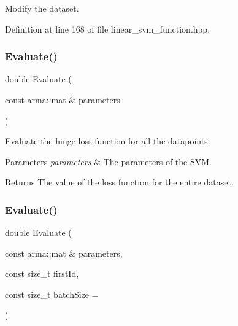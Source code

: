 Modify the dataset. 



Definition at line 168 of file linear\+\_\+svm\+\_\+function.\+hpp.

\mbox{\label{classmlpack_1_1svm_1_1LinearSVMFunction_a1ca0efaedbc2e7e7542c89901cdcf2ee}} 
\subsubsection{Evaluate()\hspace{0.1cm}{\footnotesize\ttfamily [1/2]}}
{\footnotesize\ttfamily double Evaluate (\begin{DoxyParamCaption}\item[{const arma\+::mat \&}]{parameters }\end{DoxyParamCaption})}



Evaluate the hinge loss function for all the datapoints. 


\begin{DoxyParams}{Parameters}
{\em parameters} & The parameters of the S\+VM. \\
\hline
\end{DoxyParams}
\begin{DoxyReturn}{Returns}
The value of the loss function for the entire dataset. 
\end{DoxyReturn}
\mbox{\label{classmlpack_1_1svm_1_1LinearSVMFunction_a3b3e9347c2b7e25c47f3fba3baf12d19}} 
\subsubsection{Evaluate()\hspace{0.1cm}{\footnotesize\ttfamily [2/2]}}
{\footnotesize\ttfamily double Evaluate (\begin{DoxyParamCaption}\item[{const arma\+::mat \&}]{parameters,  }\item[{const size\+\_\+t}]{first\+Id,  }\item[{const size\+\_\+t}]{batch\+Size = {} }\end{DoxyParamCaption})}



